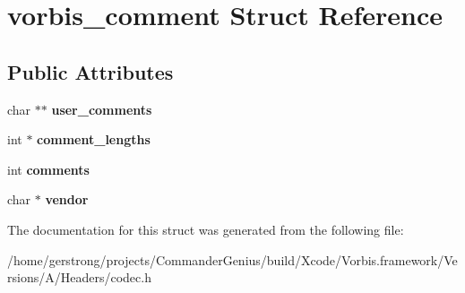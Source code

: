 \hypertarget{structvorbis__comment}{
\section{vorbis\_\-comment Struct Reference}
\label{structvorbis__comment}
}
\subsection*{Public Attributes}
\begin{DoxyCompactItemize}
\item 
\hypertarget{structvorbis__comment_ac45cb70542b0be5ce3e8d85db6df48ec}{
char $\ast$$\ast$ {\bfseries user\_\-comments}}
\label{structvorbis__comment_ac45cb70542b0be5ce3e8d85db6df48ec}

\item 
\hypertarget{structvorbis__comment_a4698d400a859e9338a5828ead97cacdf}{
int $\ast$ {\bfseries comment\_\-lengths}}
\label{structvorbis__comment_a4698d400a859e9338a5828ead97cacdf}

\item 
\hypertarget{structvorbis__comment_aa338208fb0f485b3818832a7d07dbe92}{
int {\bfseries comments}}
\label{structvorbis__comment_aa338208fb0f485b3818832a7d07dbe92}

\item 
\hypertarget{structvorbis__comment_a1f25158a2c045a6dd8a13b33b34612d3}{
char $\ast$ {\bfseries vendor}}
\label{structvorbis__comment_a1f25158a2c045a6dd8a13b33b34612d3}

\end{DoxyCompactItemize}


The documentation for this struct was generated from the following file:\begin{DoxyCompactItemize}
\item 
/home/gerstrong/projects/CommanderGenius/build/Xcode/Vorbis.framework/Versions/A/Headers/codec.h\end{DoxyCompactItemize}
